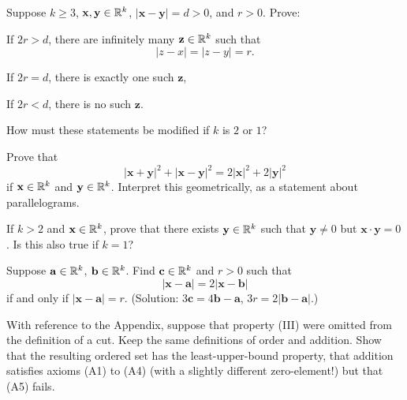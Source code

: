 \begin{myExercise}
    \label{ex:1.16}
    Suppose $k \geq 3$, $\mathbf{x}, \mathbf{y} \in {\protect\mathbb R}^k$, $|\mathbf{x} - \mathbf{y}| =d>0$, and $r >0$. Prove:
    \begin{asparaenum}[(a)]
        \item If $2r > d$, there are infinitely many $\mathbf{z} \in {\protect\mathbb R}^k$ such that
        \begin{equation*}
            |z-x| =|z-y| =r.
        \end{equation*}        
        \item If $2r = d$, there is exactly one such $\mathbf{z}$,
        \item If $2r < d$, there is no such $\mathbf{z}$.
    \end{asparaenum}
    How must these statements be modified if $k$ is $2$ or $1$?
\end{myExercise}

\mySolve



\begin{myExercise}
    \label{ex:1.17}
    Prove that
    \begin{equation*}
        |\mathbf{x} + \mathbf{y}|^2 + 
        |\mathbf{x} - \mathbf{y}|^2 =
        2|\mathbf{x}|^2 + 2|\mathbf{y}|^2
    \end{equation*}
    if $\mathbf{x} \in {\protect\mathbb R}^k$ and $\mathbf{y} \in {\protect\mathbb R}^k$. Interpret this geometrically, as a statement about parallelograms.
\end{myExercise}

\begin{myExercise}
    If $k >2$ and $\mathbf{x}\in {\protect\mathbb R}^k$, prove that there exists $\mathbf{y} \in {\protect\mathbb R}^k$ such that $\mathbf{y} \neq 0$ but $\mathbf{x}\cdot\mathbf{y} =0$.
    Is this also true if $k =1$?
\end{myExercise}

\begin{myExercise}
    Suppose $\mathbf{a} \in {\protect\mathbb R}^k$, $\mathbf{b} \in{\protect\mathbb R}^k$. Find $\mathbf{c} \in {\protect\mathbb R}^k$ and $r > 0$ such that
    \begin{equation*}
        |\mathbf{x} - \mathbf{a}| = 2|\mathbf{x} - \mathbf{b}|
    \end{equation*}
    if and only if $|\mathbf{x} - \mathbf{a}| = r$.
    (Solution: $3\mathbf{c} =4\mathbf{b}-\mathbf{a}$, $3r =2|\mathbf{b}-\mathbf{a}|$.)
\end{myExercise}

\begin{myExercise}
    With reference to the Appendix, suppose that property (III) were omitted from the
    definition of a cut. Keep the same definitions of order and addition. Show that
    the resulting ordered set has the least-upper-bound property, that addition satisfies
    axioms (A1) to (A4) (with a slightly different zero-element!) but that (A5) fails.
\end{myExercise}
